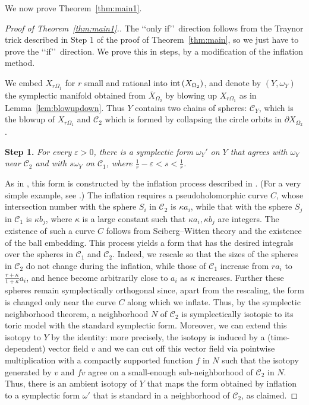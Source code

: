 \documentclass[11pt, reqno]{amsart}
\theoremstyle{remark}
\numberwithin{equation}{subsection}
\numberwithin{figure}{section}
\theoremstyle{customremark}
\newcommand{\intt}{{\rm int}}
\newcommand{\NI}{{\noindent}}
\newcommand{\Cc}{{\mathcal C}}
\newcommand{\ov}{\overline}
\newcommand{\Om}{{\Omega}}
\newcommand{\om}{{\omega}}
\newcommand{\ka}{{\kappa}}
\newcommand{\p}{{\partial}}
\newcommand{\MS}{{\medskip}}
\newcommand{\eps}{\varepsilon}
\begin{document}
We now prove Theorem~\ref{thm:main1}.




\begin{proof}[Proof of Theorem~\ref{thm:main1}.]


The \lq\lq only if\rq\rq\, direction follows from the Traynor trick described in Step 1 of the proof of Theorem~\ref{thm:main}, so we just have to prove the \lq\lq if\rq\rq\, direction.  We prove this in steps, by a modification of the inflation method.
\MS
 

  
 We embed $ X_{r\Omega_1}$ for $r$ small and rational into $\intt\, (X_{\Omega_2})$, and denote by $(Y, \om_Y)$ the symplectic manifold obtained from $\ov X_{\Om_2}$ by  blowing up $ X_{r\Omega_1}$ as in Lemma~\ref{lem:blowupdown}. Thus $Y$ contains two chains of spheres: $\Cc_Y$, which is  the blowup of $ X_{r\Omega_1}$ and  $\Cc_2$ which is formed by collapsing the circle orbits in  $\p X_{\Omega_2}$.
 
\MS
  
 \NI
{\bf Step 1.} {\it  For every $\eps>0$, there is a symplectic form $\om_Y'$ on $Y$ that agrees with $\om_Y$ near $\Cc_2$ and with $s \om_Y$ on $\Cc_1$, where $\frac 1r-\eps< s <\frac 1r$.}

 
As in \cite[Thm. 2.1]{CG},
this form  is constructed by the inflation process described in  \cite{McOp}. (For a very simple example, see
\cite[\S2.1]{Mell}.)
 The inflation requires a pseudoholomorphic curve $C$, whose intersection number with the sphere $S_i$ in
$\Cc_2$ is $\ka a_i$, while that with the sphere $S_j$ in $\Cc_1$ is $\ka b_j$, where $\ka$ is a large constant such that $\ka a_i, \ka b_j$ are integers.  The existence of such a curve $C$ follows from Seiberg--Witten theory and the existence of the ball embedding.
This process yields a form that has the desired integrals over the spheres   in $\Cc_1$ and $\Cc_2$. Indeed, we rescale so that the sizes of the spheres in $\Cc_2$ do not change during the inflation, while
those of $\Cc_1$ increase from $ra_i$ to $\frac{r + \ka }{1+\ka} a_i$, and hence become arbitrarily close to $ a_i$ as $\ka$ increases.
  Further these spheres 
 remain symplectically orthogonal  since, apart from the rescaling,  the form is changed only near the curve $C$ along which we inflate.  Thus, by the symplectic neighborhood theorem, a neighborhood $N$ of $\mathcal{C}_{2}$ is symplectically isotopic to its toric model with the standard symplectic form.  Moreover, we can extend this isotopy to $Y$ by the identity: more precisely, the isotopy is induced by a (time-dependent) vector field $v$ and we can cut off this vector field via pointwise multiplication with a compactly supported function $f$ in $N$ such that the isotopy generated by $v$ and $fv$ agree on a small-enough sub-neighborhood of 
 $\Cc_2$  in $N$.  Thus, there is an ambient isotopy of $Y$ that maps the form obtained by inflation
 to a symplectic form $\omega'$ that is standard in a neighborhood of $\Cc_2$, as claimed.  


\end{proof}
\end{document}
